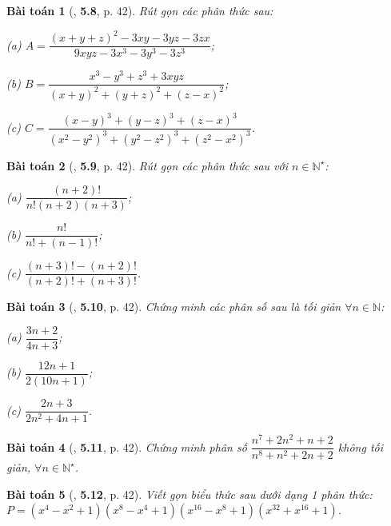 \documentclass{article}
\numberwithin{equation}{section}
\newtheorem{baitoan}{Bài toán}[section]
\begin{document}
\begin{baitoan}[\cite{Binh_Nam_Ngoc_Son_Toan_8_Dai_So}, \textbf{5.8}, p. 42]
	Rút gọn các phân thức sau:
	\begin{enumerate*}
		\item[(a)] $A = \dfrac{(x + y + z)^2 - 3xy - 3yz - 3zx}{9xyz - 3x^3 - 3y^3 - 3z^3}$;
		\item[(b)] $B = \dfrac{x^3 - y^3 + z^3 + 3xyz}{(x + y)^2 + (y + z)^2 + (z - x)^2}$;
		\item[(c)] $C = \dfrac{(x - y)^3 + (y - z)^3 + (z - x)^3}{(x^2 - y^2)^3 + (y^2 - z^2)^3 + (z^2 - x^2)^3}$.
	\end{enumerate*}
\end{baitoan}

\begin{baitoan}[\cite{Binh_Nam_Ngoc_Son_Toan_8_Dai_So}, \textbf{5.9}, p. 42]
	Rút gọn các phân thức sau với $n\in\mathbb{N}^\star$:
	\begin{enumerate*}
		\item[(a)] $\dfrac{(n + 2)!}{n!(n + 2)(n + 3)}$;
		\item[(b)] $\dfrac{n!}{n! + (n - 1)!}$;
		\item[(c)] $\dfrac{(n + 3)! - (n + 2)!}{(n + 2)! + (n + 3)!}$.
	\end{enumerate*}
\end{baitoan}

\begin{baitoan}[\cite{Binh_Nam_Ngoc_Son_Toan_8_Dai_So}, \textbf{5.10}, p. 42]
	Chứng minh các phân số sau là tối giản $\forall n\in\mathbb{N}$:
	\begin{enumerate*}
		\item[(a)] $\dfrac{3n + 2}{4n + 3}$;
		\item[(b)] $\dfrac{12n + 1}{2(10n + 1)}$;
		\item[(c)] $\dfrac{2n + 3}{2n^2 + 4n + 1}$.
	\end{enumerate*}
\end{baitoan}

\begin{baitoan}[\cite{Binh_Nam_Ngoc_Son_Toan_8_Dai_So}, \textbf{5.11}, p. 42]
	Chứng minh phân số $\dfrac{n^7 + 2n^2 + n + 2}{n^8 + n^2 + 2n + 2}$ không tối giản, $\forall n\in\mathbb{N}^\star$.
\end{baitoan}

\begin{baitoan}[\cite{Binh_Nam_Ngoc_Son_Toan_8_Dai_So}, \textbf{5.12}, p. 42]
	Viết gọn biểu thức sau dưới dạng 1 phân thức: $P = (x^4 - x^2 + 1)(x^8 - x^4 + 1)(x^{16} - x^8 + 1)(x^{32} + x^{16} + 1)$.
\end{baitoan}
\end{document}
